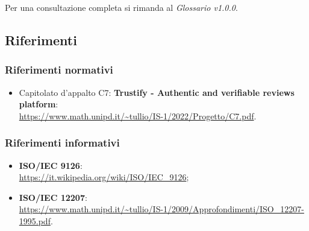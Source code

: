 Per una consultazione completa si rimanda al \textit{Glossario v1.0.0}.

\subsection{Riferimenti}
\subsubsection{Riferimenti normativi}
\begin{itemize}
    \item Capitolato d'appalto C7: \textbf{Trustify - Authentic and verifiable reviews platform}: \\
          \url{https://www.math.unipd.it/~tullio/IS-1/2022/Progetto/C7.pdf}.
\end{itemize}
\subsubsection{Riferimenti informativi}
\begin{itemize}
       \item \textbf{ISO/IEC 9126}: \\
          \url{https://it.wikipedia.org/wiki/ISO/IEC_9126};
      \item \textbf{ISO/IEC 12207}: \\
          \url{https://www.math.unipd.it/~tullio/IS-1/2009/Approfondimenti/ISO_12207-1995.pdf}.
\end{itemize}